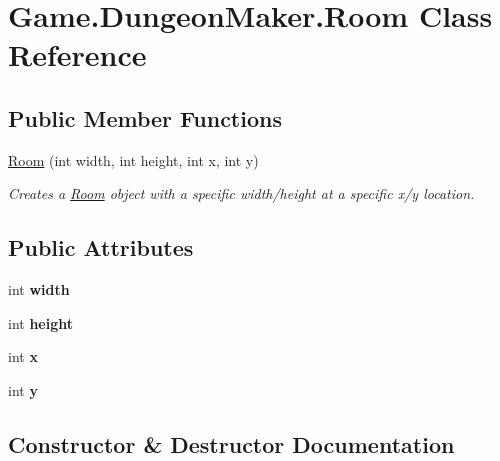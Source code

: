 \hypertarget{class_game_1_1_dungeon_maker_1_1_room}{}\section{Game.\+Dungeon\+Maker.\+Room Class Reference}
\label{class_game_1_1_dungeon_maker_1_1_room}
\subsection*{Public Member Functions}
\begin{DoxyCompactItemize}
\item 
\mbox{\hyperlink{class_game_1_1_dungeon_maker_1_1_room_abbd9573ede25a9fce7675034863542d9}{Room}} (int width, int height, int x, int y)
\begin{DoxyCompactList}\small\item\em Creates a {\ttfamily \mbox{\hyperlink{class_game_1_1_dungeon_maker_1_1_room}{Room}}} object with a specific width/height at a specific x/y location. \end{DoxyCompactList}\end{DoxyCompactItemize}
\subsection*{Public Attributes}
\begin{DoxyCompactItemize}
\item 
\mbox{\label{class_game_1_1_dungeon_maker_1_1_room_a732fdc6d23d0cf6de459470b6cbc2423}} 
int {\bfseries width}
\item 
\mbox{\label{class_game_1_1_dungeon_maker_1_1_room_a85af9703757169cabe5b1013a986550f}} 
int {\bfseries height}
\item 
\mbox{\label{class_game_1_1_dungeon_maker_1_1_room_a86997730f14143525d7b7006ca6c1472}} 
int {\bfseries x}
\item 
\mbox{\label{class_game_1_1_dungeon_maker_1_1_room_a50f07d97020c6d21362a6db20b0139b0}} 
int {\bfseries y}
\end{DoxyCompactItemize}


\subsection{Constructor \& Destructor Documentation}
\mbox{\label{class_game_1_1_dungeon_maker_1_1_room_abbd9573ede25a9fce7675034863542d9}} 
